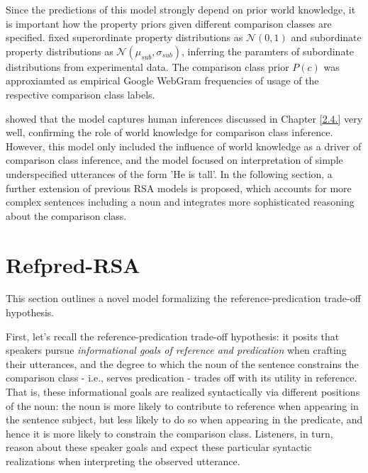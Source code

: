 Since the predictions of this model strongly depend on prior world knowledge, it is important how the property priors given different comparison classes are specified. \textcite{tessler2017warm} fixed superordinate property distributions as $\mathcal{N} (0, 1)$ and subordinate property distributions as $\mathcal{N}(\mu_{sub}, \sigma_{sub})$, inferring the paramters of subordinate distributions from experimental data. The comparison class prior $P(c)$ was approxiamted as empirical Google WebGram frequencies of usage of the respective comparison class labels. 

\textcite{tessler2017warm} showed that the model captures human inferences discussed in Chapter \ref{2.4.} very well, confirming the role of world knowledge for comparison class inference. 
However, this model only included the influence of world knowledge as a driver of comparison class inference, and the model focused on interpretation of simple underspecified utterances of the form 'He is tall'. In the following section, a further extension of previous RSA models is proposed, which accounts for more complex sentences including a noun and integrates more sophisticated reasoning about the comparison class.  

\section{Refpred-RSA}
This section outlines a novel model formalizing the reference-predication trade-off hypothesis.

First, let's recall the reference-predication trade-off hypothesis: it posits that speakers pursue \emph{informational goals of reference and predication} when crafting their utterances, and the degree to which the noun of the sentence constrains the comparison class - i.e., serves predication - trades off with its utility in reference. That is, these informational goals are realized syntactically via different positions of the noun: the noun is more likely to contribute to reference when appearing in the sentence subject, but less likely to do so when appearing in the predicate, and hence it is more likely to constrain the comparison class. Listeners, in turn, reason about these speaker goals and expect these particular syntactic realizations when interpreting the observed utterance.  

